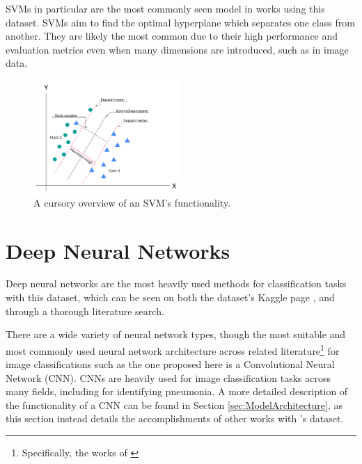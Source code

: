 \documentclass[12pt]{report}
\newcommand{\para}{\vspace{7pt}\noindent}
\begin{document}
\para SVMs in particular are the most commonly seen model in works using this dataset. SVMs aim to find the optimal hyperplane 
which separates one class from another. They are likely the most common due to their high performance and evaluation
metrics even when many dimensions are introduced, such as in image data. 

\begin{figure}[H]
    \centering
    \includegraphics[width=0.5\textwidth]{Proposal/SVM.png}
    \caption{A cursory overview of an SVM's functionality.\label{fig:SVM}}
\end{figure}


\section{Deep Neural Networks}
Deep neural networks are the most heavily used methods for classification tasks with this dataset, which can be seen on both the 
dataset's Kaggle page \autocite{mooneyChestXRayImages2018}, and through a thorough literature search.

\para There are a wide variety of neural network 
types, though the most suitable and most commonly used neural network architecture across related literature\footnote{Specifically, the works of \textcite{elasnaouiDesignEnsembleDeep2021a,rajpurkarCheXNetRadiologistLevelPneumonia2017,sourabComparisonHybridDeep2022,stephenEfficientDeepLearning2019,umaribrahimConvolutionalNeuralNetwork2022b}} 
for image classifications such as the one proposed here is a Convolutional Neural Network (CNN).
CNNs are heavily used for image classification tasks across many fields, including for identifying pneumonia. A more detailed 
description of the functionality of a CNN can be found in Section \ref{sec:ModelArchitecture}, as this section instead details 
the accomplishments of other works with \textcite{kermanyIdentifyingMedicalDiagnoses2018}'s dataset.
\end{document}
